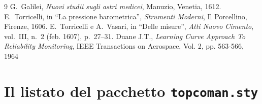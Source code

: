 \documentclass[%
    corpo=11pt,
    twoside,
    greek,
    evenboxes,
    tipotesi=secondaria,
]{toptesi}
\begin{document}
\appendix

\begin{thebibliography}{9}
 G.~Galilei, {\em Nuovi studii sugli astri medicei}, Manuzio,
        Venetia, 1612.
 E.~Torricelli, in ``La pressione barometrica'', {\em Strumenti
        Moderni}, Il Porcellino, Firenze, 1606.
 E.~Torricelli e A.~Vasari, in ``Delle misure'', {\em Atti Nuovo
        Cimento}, vol.~III, n.~2 (feb. 1607), p.~27--31.
 Duane J.T., \emph{Learning Curve Approach To Reliability 
		Monitoring}, IEEE Transactions on Aerospace, Vol. 2, pp. 563-566, 1964
\end{thebibliography}



\chapter{Il listato del pacchetto \texttt{topcoman.sty}}
\end{document}
